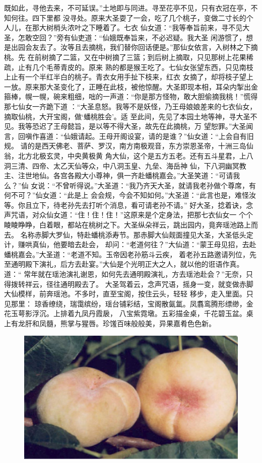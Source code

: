 \documentclass[a4paper,11pt,onecolumn,twoside]{article}
\begin{document}
\begin{CJK}{UTF8}{gbsn}
\begin{multicols}{2}
			既如此，寻他去来，不可延误。”土地即与同进。寻至花亭不见，只有衣冠在亭，不知何往。四下里都
			没寻处。原来大圣耍了一会，吃了几个桃子，变做二寸长的个人儿，在那大树梢头浓叶之下睡着了。七衣
			仙女道：“我等奉旨前来，寻不见大圣，怎敢空回？”旁有仙吏道：“仙娥既奉旨来，不必迟疑。我大圣
			闲游惯了，想是出园会友去了。汝等且去摘桃，我们替你回话便是。”那仙女依言，入树林之下摘桃。先
			在前树摘了二篮，又在中树摘了三篮；到后树上摘取，只见那树上花果稀疏，止有几个毛蒂青皮的。原来
			熟的都是猴王吃了。七仙女张望东西，只见南枝上止有一个半红半白的桃子。青衣女用手扯下枝来，红衣
			女摘了，却将枝子望上一放。原来那大圣变化了，正睡在此枝，被他惊醒。大圣即现本相，耳朵内掣出金
			箍棒，幌一幌，碗来粗细，咄的一声道：“你是那方怪物，敢大胆偷摘我桃！”慌得那七仙女一齐跪下道
			：“大圣息怒。我等不是妖怪，乃王母娘娘差来的七衣仙女，摘取仙桃，大开宝阁，做‘蟠桃胜会’。适
			至此间，先见了本园土地等神，寻大圣不见。我等恐迟了王母懿旨，是以等不得大圣，故先在此摘桃，万
			望恕罪。”大圣闻言，回嗔作喜道：“仙娥请起。王母开阁设宴，请的是谁？”仙女道：“上会自有旧规。
			请的是西天佛老、菩萨、罗汉，南方南极观音，东方崇恩圣帝，十洲三岛仙翁，北方北极玄灵，中央黄极黄
			角大仙，这个是五方五老。还有五斗星君，上八洞三清、四帝、太乙天仙等众，中八洞玉皇、九垒、海岳神
			仙，下八洞幽冥教主、注世地仙。各宫各殿大小尊神，俱一齐赴蟠桃嘉会。”大圣笑道：“可请我么？”仙
			女说：“不曾听得说。”大圣道：“我乃齐天大圣，就请我老孙做个尊席，有何不可？”仙女道：“此是上
			会会规，今会不知如何。”大圣道：“此言也是，难怪汝等。你且立下，待老孙先去打听个消息，看可请老孙不请。”
			好大圣，捻着诀，念声咒语，对众仙女道：“住！住！住！”这原来是个定身法，把那七衣仙女一
			个个睖睖睁睁，白着眼，都站在桃树之下。大圣纵朵祥云，跳出园内，竟奔瑶池路上而去。
			\indent 名称赤脚大罗仙，特赴蟠桃添寿节。那赤脚大仙觌面撞见大圣，大圣低头定计，赚哄真仙，他要暗去赴会，
			却问：“老道何往？”大仙道：“蒙王母见招，去赴蟠桃嘉会。”大圣道：“老道不知。玉帝因老孙筋斗云疾，
			着老孙五路邀请列位，先至通明殿下演礼，后方去赴宴。”大仙是个光明正大之人，就以他的诳语作真。道：“
			常年就在瑶池演礼谢恩，如何先去通明殿演礼，方去瑶池赴会？”无奈，只得拨转祥云，径往通明殿去了。
			\indent 大圣驾着云，念声咒语，摇身一变，就变做赤脚大仙模样，前奔瑶池。不多时，直至宝阁，按住云头，轻轻
			移步，走入里面。只见那里：
			琼香缭绕，瑞霭缤纷，瑶台铺彩结，宝阁散氤氲。凤翥鸾腾形缥缈，金花玉萼影浮沉。上排着九凤丹霞扆，
			八宝紫霓墩。五彩描金桌，千花碧玉盆。桌上有龙肝和凤髓，熊掌与猩唇。珍馐百味般般美，异果嘉肴色色新。
			\begin{figure}
				\centering
				\includegraphics[width=12cm]{Pantao.jpg}

\end{figure}
\end{multicols}
\end{CJK}
\end{document}
